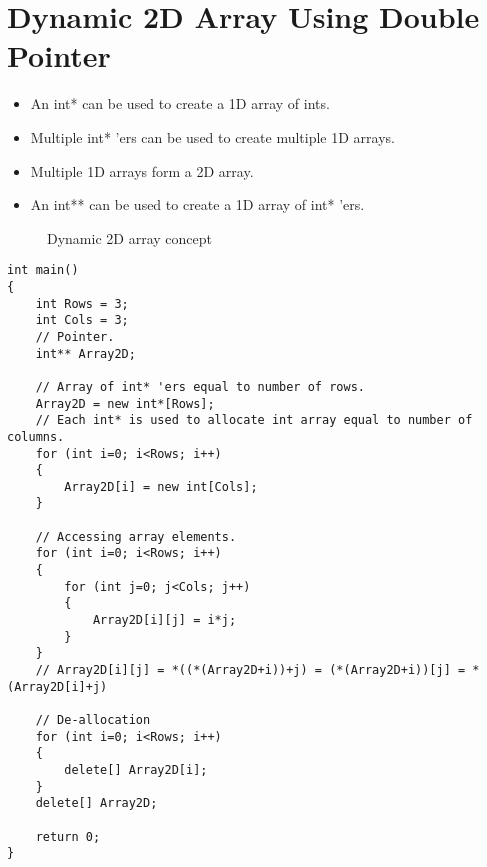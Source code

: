 \documentclass[12pt,a4paper]{article}
\begin{document}
\section{Dynamic 2D Array Using Double Pointer}
\begin{itemize}
\item An int* can be used to create a 1D array of ints.
\item Multiple int* 'ers can be used to create multiple 1D arrays.
\item Multiple 1D arrays form a 2D array.
\item An int** can be used to create a 1D array of int* 'ers.
\end{itemize}
\begin{figure}[H]
\centering
{}
\caption{Dynamic 2D array concept}
\label{Dynamic-2D-array-concept}
\end{figure}
\begin{lstlisting}[caption={Dynamic 2D array}]
int main()
{
	int Rows = 3;
	int Cols = 3;
	// Pointer.
	int** Array2D;

	// Array of int* 'ers equal to number of rows.
	Array2D = new int*[Rows];
	// Each int* is used to allocate int array equal to number of columns.
	for (int i=0; i<Rows; i++)
	{
		Array2D[i] = new int[Cols];
	}

	// Accessing array elements.
	for (int i=0; i<Rows; i++)
	{
		for (int j=0; j<Cols; j++)
		{
			Array2D[i][j] = i*j;
		}
	}
	// Array2D[i][j] = *((*(Array2D+i))+j) = (*(Array2D+i))[j] = *(Array2D[i]+j)

	// De-allocation
	for (int i=0; i<Rows; i++)
	{
		delete[] Array2D[i];
	}
	delete[] Array2D;

	return 0;
}
\end{lstlisting}


\end{document}
